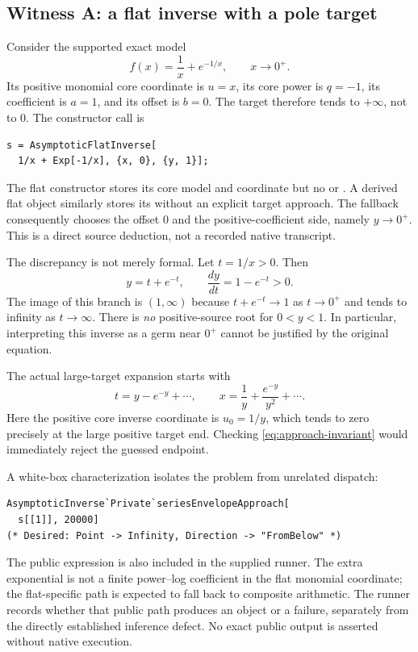 \subsection{Witness A: a flat inverse with a pole target}

Consider the supported exact model
\begin{equation}\label{eq:flat-pole}
 f(x)=\frac1x+e^{-1/x},\qquad x\to0^+.
\end{equation}
Its positive monomial core coordinate is $u=x$, its core power is $q=-1$, its coefficient is $a=1$, and its offset is $b=0$. The target therefore tends to $+\infty$, not to $0$. The constructor call is
\begin{lstlisting}
s = AsymptoticFlatInverse[
  1/x + Exp[-1/x], {x, 0}, {y, 1}];
\end{lstlisting}
The flat constructor stores its core model and coordinate but no  or . A derived flat object similarly stores its  without an explicit target approach. The fallback consequently chooses the offset $0$ and the positive-coefficient side, namely $y\to0^+$. This is a direct source deduction, not a recorded native transcript.\cite{flat,flatops,envelope}

The discrepancy is not merely formal. Let $t=1/x>0$. Then
\[
 y=t+e^{-t},\qquad \frac{dy}{dt}=1-e^{-t}>0.
\]
The image of this branch is $(1,\infty)$ because $t+e^{-t}\to1$ as $t\to0^+$ and tends to infinity as $t\to\infty$. There is \emph{no} positive-source root for $0<y<1$. In particular, interpreting this inverse as a germ near $0^+$ cannot be justified by the original equation.

The actual large-target expansion starts with
\[
 t=y-e^{-y}+\cdots,
 \qquad x=\frac1y+\frac{e^{-y}}{y^2}+\cdots.
\]
Here the positive core inverse coordinate is $u_0=1/y$, which tends to zero precisely at the large positive target end. Checking \eqref{eq:approach-invariant} would immediately reject the guessed endpoint.

A white-box characterization isolates the problem from unrelated dispatch:
\begin{lstlisting}
AsymptoticInverse`Private`seriesEnvelopeApproach[
  s[[1]], 20000]
(* Desired: Point -> Infinity, Direction -> "FromBelow" *)
\end{lstlisting}
The public expression  is also included in the supplied runner. The extra exponential is not a finite power--log coefficient in the flat monomial coordinate; the flat-specific path is expected to fall back to composite arithmetic. The runner records whether that public path produces an object or a failure, separately from the directly established inference defect. No exact public output is asserted without native execution.

